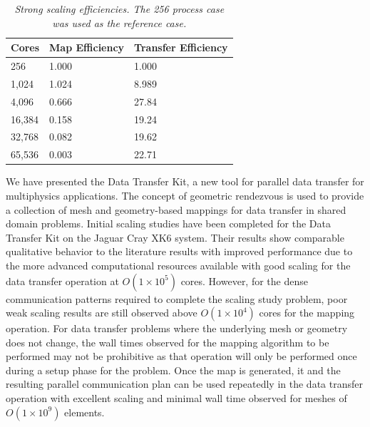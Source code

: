 \documentclass{mc2013}
\begin{document}
\begin{table}[htpb!]
  \begin{center}
    \begin{tabular}{lll}\hline\hline
      \multicolumn{1}{c}{Cores}& \multicolumn{1}{c}{Map Efficiency} &
      \multicolumn{1}{c}{Transfer Efficiency}\\\hline\hline %
      256 &
      1.000 & 1.000 \\ 1,024 & 1.024 & 8.989 \\ 4,096 & 0.666 & 27.84
      \\ 16,384 & 0.158 & 19.24 \\ 32,768 & 0.082 & 19.62 \\ 65,536 &
      0.003 & 22.71 \\ \hline\hline
    \end{tabular}
  \end{center}
  \caption{\sl Strong scaling efficiencies. The 256 process case was
    used as the reference case.}
  \label{tab:strong_efficiency}
\end{table}


We have presented the Data Transfer Kit, a new tool for parallel data
transfer for multiphysics applications. The concept of geometric
rendezvous is used to provide a collection of mesh and geometry-based
mappings for data transfer in shared domain problems. Initial scaling
studies have been completed for the Data Transfer Kit on the Jaguar
Cray XK6 system. Their results show comparable qualitative behavior to
the literature results with improved performance due to the more
advanced computational resources available with good scaling for the
data transfer operation at $O(1 \times 10^5)$ cores. However, for the
dense communication patterns required to complete the scaling study
problem, poor weak scaling results are still observed above $O(1
\times 10^4)$ cores for the mapping operation. For data transfer
problems where the underlying mesh or geometry does not change, the
wall times observed for the mapping algorithm to be performed may not
be prohibitive as that operation will only be performed once during a
setup phase for the problem. Once the map is generated, it and the
resulting parallel communication plan can be used repeatedly in the
data transfer operation with excellent scaling and minimal wall time
observed for meshes of $O(1 \times 10^9)$ elements.
\end{document}
